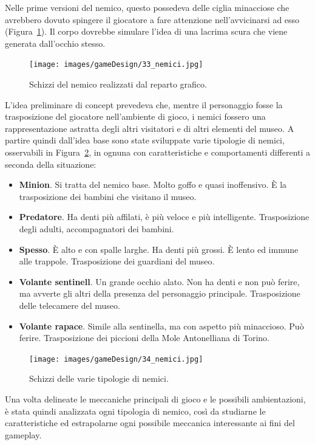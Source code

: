 Nelle prime versioni del nemico, questo possedeva delle ciglia minacciose che avrebbero dovuto spingere il giocatore a fare attenzione nell’avvicinarsi ad esso (Figura~\ref{fig:ambientazione_nemico_01}).
Il corpo dovrebbe simulare l’idea di una lacrima scura che viene generata dall’occhio stesso.

\begin{figure}%
	\centering
	\texttt{[image: images/gameDesign/33\_nemici.jpg]}
	\caption{Schizzi del nemico realizzati dal reparto grafico.}
	\label{fig:ambientazione_nemico_01}
\end{figure}

L’idea preliminare di concept prevedeva che, mentre il personaggio fosse la trasposizione del giocatore nell’ambiente di gioco, i nemici fossero una rappresentazione astratta degli altri visitatori e di altri elementi del museo.
A partire quindi dall’idea base sono state sviluppate varie tipologie di nemici, osservabili in Figura~\ref{fig:ambientazione_nemico_02}, in ognuna con caratteristiche e comportamenti differenti a seconda della situazione:

\begin{itemize}
	\item \textbf{Minion}. Si tratta del nemico base. Molto goffo e quasi inoffensivo. È la trasposizione dei bambini che visitano il museo.
	\item \textbf{Predatore}. Ha denti più affilati, è più veloce e più intelligente. Trasposizione degli adulti, accompagnatori dei bambini.
	\item \textbf{Spesso}. È alto e con spalle larghe. Ha denti più grossi. È lento ed immune alle trappole. Trasposizione dei guardiani del museo.
	\item \textbf{Volante sentinell}. Un grande occhio alato. Non ha denti e non può ferire, ma avverte gli altri della presenza del personaggio principale. Trasposizione delle telecamere del museo.
	\item \textbf{Volante rapace}. Simile alla sentinella, ma con aspetto più minaccioso. Può ferire. Trasposizione dei piccioni della Mole Antonelliana di Torino.
\end{itemize}

\begin{figure}%
	\centering
	\texttt{[image: images/gameDesign/34\_nemici.jpg]}
	\caption{Schizzi delle varie tipologie di nemici.}
	\label{fig:ambientazione_nemico_02}
\end{figure}

Una volta delineate le meccaniche principali di gioco e le possibili ambientazioni, è stata quindi analizzata ogni tipologia di nemico, così da studiarne le caratteristiche ed estrapolarne ogni possibile meccanica interessante ai fini del gameplay.

